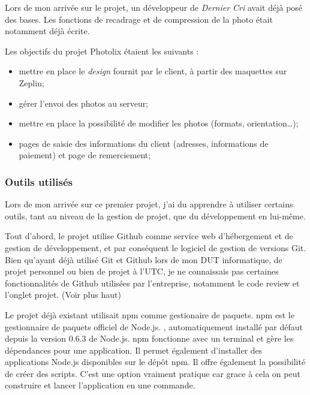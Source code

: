 \documentclass[12pt,a4paper]{article}
\providecommand{\tightlist}{%
  \setlength{\itemsep}{0pt}\setlength{\parskip}{0pt}}
\begin{document}
  \bigskip

  Lors de mon arrivée sur le projet, un développeur de \emph{Dernier Cri}
  avait déjà posé des bases. Les fonctions de recadrage et de compression
  de la photo était notamment déjà écrite.

  \bigskip

  Les objectifs du projet Photolix étaient les suivants :

  \begin{itemize}
  \tightlist
  \item
    mettre en place le \emph{design} fournit par le client, à partir des
    maquettes sur Zeplin;
  \item
    gérer l'envoi des photos au serveur;
  \item
    mettre en place la possibilité de modifier les photos (formats,
    orientation\ldots{});
  \item
    pages de saisie des informations du client (adresses, informations de
    paiement) et page de remerciement;
  \end{itemize}

  \bigskip

  \subsubsection{Outils utilisés}\label{outils-utilisuxe9s}

  \bigskip

  Lors de mon arrivée sur ce premier projet, j'ai du apprendre à utiliser
  certains outils, tant au niveau de la gestion de projet, que du
  développement en lui-même.

  \bigskip

  Tout d'abord, le projet utilise Github comme service web d'hébergement
  et de gestion de développement, et par conséquent le logiciel de gestion
  de versions Git. Bien qu'ayant déjà utilisé Git et Github lors de mon
  DUT informatique, de projet personnel ou bien de projet à l'UTC, je ne
  connaissais pas certaines fonctionnalités de Github utilisées par
  l'entreprise, notamment le code review et l'onglet projet. (Voir plus
  haut)

  \bigskip

  Le projet déjà existant utilisait npm comme gestionaire de paquets. npm
  est le gestionnaire de paquets officiel de Node.js. , automatiquement
  installé par défaut depuis la version 0.6.3 de Node.js. npm fonctionne
  avec un terminal et gère les dépendances pour une application. Il permet
  également d'installer des applications Node.js disponibles sur le dépôt
  npm. Il offre également la possibilité de créer des scripts. C'est une
  option vraiment pratique car grace à cela on peut construire et lancer
  l'application en une commande.
\end{document}

